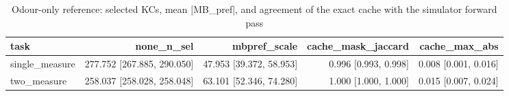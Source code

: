\begin{table}[t]
\centering
\small
\begin{tabular}{lrrrr}
\toprule
task & none\_n\_sel & mbpref\_scale & cache\_mask\_jaccard & cache\_max\_abs \\
\midrule
single\_measure & 277.752 [267.885, 290.050] & 47.953 [39.372, 58.953] & 0.996 [0.993, 0.998] & 0.008 [0.001, 0.016] \\
two\_measure & 258.037 [258.028, 258.048] & 63.101 [52.346, 74.280] & 1.000 [1.000, 1.000] & 0.015 [0.007, 0.024] \\
\bottomrule
\end{tabular}
\caption{Odour-only reference: selected KCs, mean |MB\_pref|, and agreement of the exact cache with the simulator forward pass}
\label{tab:dan_kc_baseline}
\end{table}